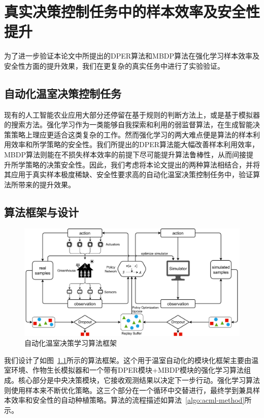 
\chapter{真实决策控制任务中的样本效率及安全性提升}

为了进一步验证本论文中所提出的DPER算法和MBDP算法在强化学习样本效率及安全性方面的提升效果，我们在更复杂的真实任务中进行了实验验证。

\section{自动化温室决策控制任务}

现有的人工智能农业应用大部分还停留在基于规则的判断方法上，或是基于模拟器的搜索方法。强化学习作为一类能够自我探索和利用的弱监督算法，在生成智能决策策略上理应更适合这类复杂的工作。然而强化学习的两大难点便是算法的样本利用效率和所学策略的安全性。我们所提出的DPER算法能大幅改善样本利用效率，MBDP算法则能在不损失样本效率的前提下尽可能提升算法鲁棒性，从而间接提升所学策略的决策安全性。因此，我们考虑将本论文提出的两种算法相结合，并将其应用于真实样本极度稀缺、安全性要求高的自动化温室决策控制任务中，验证算法所带来的提升效果。

\section{算法框架与设计}

\begin{figure}
\centering
\includegraphics[width=\textwidth]{figures/framework.pdf}
\caption{自动化温室决策学习算法框架}
\label{fig:framework}
\end{figure}

我们设计了如图~\ref{fig:framework}所示的算法框架。这个用于温室自动化的模块化框架主要由温室环境、作物生长模拟器和一个带有DPER模块+MBDP模块的强化学习算法组成。核心部分是中央决策模块，它接收观测结果以决定下一步行动。强化学习算法则使用样本来不断优化策略。这三个部分在一个循环中交替进行，最终学到兼具样本效率和安全性的自动种植策略。算法的流程描述如算法~\ref{algo:acml-method}所示。

